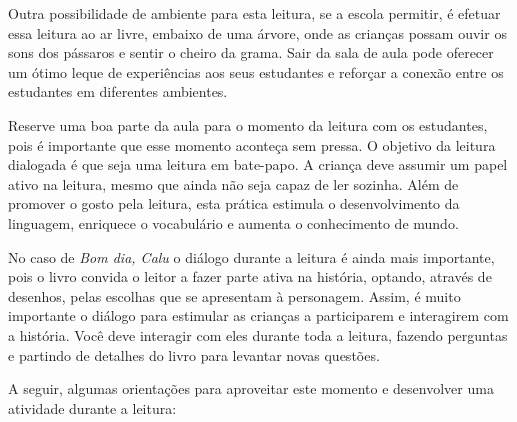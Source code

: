 \documentclass[11pt]{extarticle}
\begin{document}

Outra possibilidade de ambiente para esta leitura, se a escola permitir, 
é efetuar essa leitura ao ar livre, embaixo de uma árvore, onde as crianças 
possam ouvir os sons dos pássaros e sentir o cheiro da grama. Sair da sala 
de aula pode oferecer um ótimo leque de experiências aos seus estudantes e 
reforçar a conexão entre os estudantes em diferentes ambientes.  

Reserve uma boa parte da aula para o momento da leitura com os estudantes, 
pois é importante que esse momento aconteça sem pressa. O objetivo da 
leitura dialogada é que seja uma leitura em bate-papo. A criança deve 
assumir um papel ativo na leitura, mesmo que ainda não seja capaz de 
ler sozinha. Além de promover o gosto pela leitura, esta prática estimula 
o desenvolvimento da linguagem, enriquece o vocabulário e 
aumenta o conhecimento de mundo.

No caso de \textit{Bom dia, Calu} o diálogo durante a leitura é 
ainda mais importante, pois o livro convida o leitor a fazer parte ativa na história, optando, através de desenhos, pelas escolhas que se apresentam à personagem. Assim, é muito importante o diálogo para estimular as crianças a participarem e interagirem com a história.
Você deve interagir com eles durante toda a 
leitura, fazendo perguntas e partindo de detalhes do livro para 
levantar novas questões. 

A seguir, algumas orientações para aproveitar este momento e desenvolver uma atividade durante a leitura: 
\end{document}
